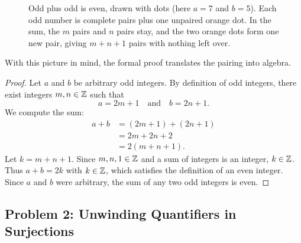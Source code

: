 \begin{figure}[htbp]
\caption{Odd plus odd is even, drawn with dots (here $a = 7$ and $b = 5$). Each odd number is complete pairs plus one unpaired orange dot. In the sum, the $m$ pairs and $n$ pairs stay, and the two orange dots form one new pair, giving $m + n + 1$ pairs with nothing left over.}\label{guide:fig-parity-pairing}
\end{figure}

With this picture in mind, the formal proof translates the pairing into algebra.

\begin{proof}
Let $a$ and $b$ be arbitrary odd integers. By definition of odd integers, there exist integers $m, n \in \mathbb{Z}$ such that
\[
a = 2m + 1 \quad \text{and} \quad b = 2n + 1.
\]
We compute the sum:
\begin{align*}
a + b &= (2m + 1) + (2n + 1) \\
&= 2m + 2n + 2 \\
&= 2(m + n + 1).
\end{align*}
Let $k = m + n + 1$. Since $m, n, 1 \in \mathbb{Z}$ and a sum of integers is an integer, $k \in \mathbb{Z}$. Thus $a + b = 2k$ with $k \in \mathbb{Z}$, which satisfies the definition of an even integer. Since $a$ and $b$ were arbitrary, the sum of any two odd integers is even.
\end{proof}

\subsection{Problem 2: Unwinding Quantifiers in Surjections}

